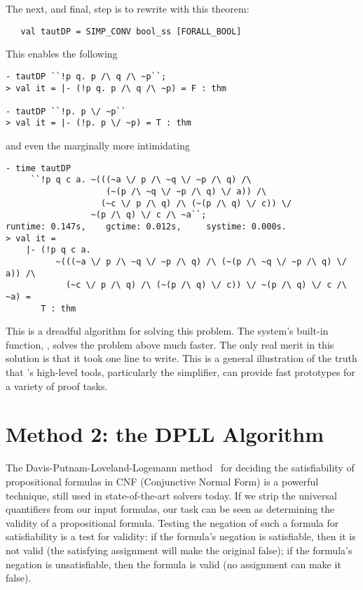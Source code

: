 The next, and final, step is to rewrite with this theorem:
\begin{hol}
\begin{verbatim}
   val tautDP = SIMP_CONV bool_ss [FORALL_BOOL]
\end{verbatim}
\end{hol}

This enables the following

\begin{session}
\begin{verbatim}
- tautDP ``!p q. p /\ q /\ ~p``;
> val it = |- (!p q. p /\ q /\ ~p) = F : thm

- tautDP ``!p. p \/ ~p``
> val it = |- (!p. p \/ ~p) = T : thm
\end{verbatim}
\end{session}
and even the marginally more intimidating
\begin{session}
\begin{verbatim}
- time tautDP
     ``!p q c a. ~(((~a \/ p /\ ~q \/ ~p /\ q) /\
                    (~(p /\ ~q \/ ~p /\ q) \/ a)) /\
                   (~c \/ p /\ q) /\ (~(p /\ q) \/ c)) \/
                 ~(p /\ q) \/ c /\ ~a``;
runtime: 0.147s,    gctime: 0.012s,     systime: 0.000s.
> val it =
    |- (!p q c a.
          ~(((~a \/ p /\ ~q \/ ~p /\ q) /\ (~(p /\ ~q \/ ~p /\ q) \/ a)) /\
            (~c \/ p /\ q) /\ (~(p /\ q) \/ c)) \/ ~(p /\ q) \/ c /\ ~a) =
       T : thm
\end{verbatim}
\end{session}

This is a dreadful algorithm for solving this problem.  The system's
built-in function, , solves the problem above
much faster.  The only real
merit in this solution is that it took one line to write.  This is a
general illustration of the truth that \HOL{}'s high-level tools,
particularly the simplifier, can provide fast prototypes for a variety
of proof tasks.

\section{Method 2: the DPLL Algorithm}

The Davis-Putnam-Loveland-Logemann method~\cite{DPLL-paper} for
deciding the satisfiability of propositional formulas in CNF
(Conjunctive Normal Form) is a powerful technique, still used in
state-of-the-art solvers today.  If we strip the universal quantifiers
from our input formulas, our task can be seen as determining the
validity of a propositional formula.  Testing the negation of such a
formula for satisfiability is a test for validity: if the formula's
negation is satisfiable, then it is not valid (the satisfying
assignment will make the original false); if the formula's negation is
unsatisfiable, then the formula is valid (no assignment can make it
false).

